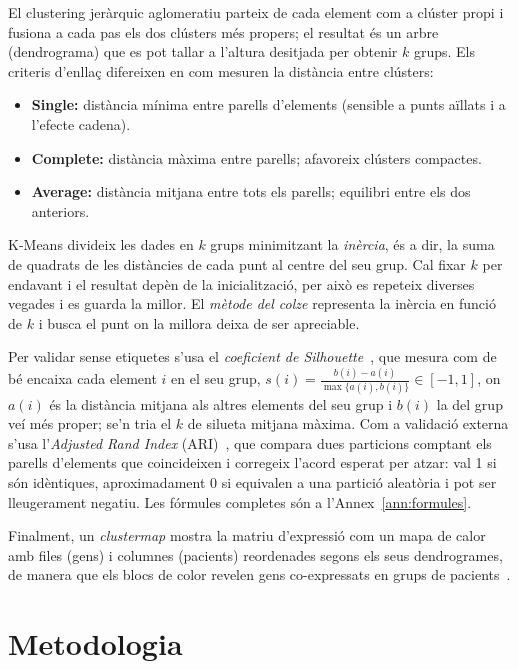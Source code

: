 \documentclass[11pt,a4paper]{article}
\begin{document}
El clustering jeràrquic aglomeratiu parteix de cada element com a clúster propi i fusiona a cada pas els dos clústers més propers; el resultat és un arbre (dendrograma) que es pot tallar a l'altura desitjada per obtenir $k$ grups. Els criteris d'enllaç difereixen en com mesuren la distància entre clústers:
\begin{itemize}
  \item \textbf{Single:} distància mínima entre parells d'elements (sensible a punts aïllats i a l'efecte cadena).
  \item \textbf{Complete:} distància màxima entre parells; afavoreix clústers compactes.
  \item \textbf{Average:} distància mitjana entre tots els parells; equilibri entre els dos anteriors.
\end{itemize}
K-Means divideix les dades en $k$ grups minimitzant la \emph{inèrcia}, és a dir, la suma de quadrats de les distàncies de cada punt al centre del seu grup. Cal fixar $k$ per endavant i el resultat depèn de la inicialització, per això es repeteix diverses vegades i es guarda la millor. El \emph{mètode del colze} representa la inèrcia en funció de $k$ i busca el punt on la millora deixa de ser apreciable.

Per validar sense etiquetes s'usa el \emph{coeficient de Silhouette}~\cite{rousseeuw}, que mesura com de bé encaixa cada element $i$ en el seu grup, $s(i)=\frac{b(i)-a(i)}{\max\{a(i),b(i)\}}\in[-1,1]$, on $a(i)$ és la distància mitjana als altres elements del seu grup i $b(i)$ la del grup veí més proper; se'n tria el $k$ de silueta mitjana màxima. Com a validació externa s'usa l'\emph{Adjusted Rand Index} (ARI)~\cite{hubert}, que compara dues particions comptant els parells d'elements que coincideixen i corregeix l'acord esperat per atzar: val 1 si són idèntiques, aproximadament 0 si equivalen a una partició aleatòria i pot ser lleugerament negatiu. Les fórmules completes són a l'Annex~\ref{ann:formules}.

Finalment, un \emph{clustermap} mostra la matriu d'expressió com un mapa de calor amb files (gens) i columnes (pacients) reordenades segons els seus dendrogrames, de manera que els blocs de color revelen gens co-expressats en grups de pacients~\cite{eisen}.

\vspace{0.4cm}
\section{Metodologia}
\end{document}
